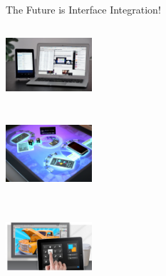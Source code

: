 \begin{frame}
\begin{block}{The Future is Interface Integration!}
\begin{minipage}{1.0\linewidth}
\begin{center}
\begin{minipage}{.32\linewidth}
\begin{center}
\includegraphics[height=28mm, width=32mm]{images/Apple.jpg}
\end{center}
\end{minipage}
\begin{minipage}{.32\linewidth}
\begin{center}
\includegraphics[height=28mm, width=32mm]{images/microsoft2.jpg}\\$\;$\\
\includegraphics[height=28mm, width=32mm]{images/Adobe.jpg}
\end{center}
\end{minipage}
\end{center}
\end{minipage}
\end{block}
\end{frame}


